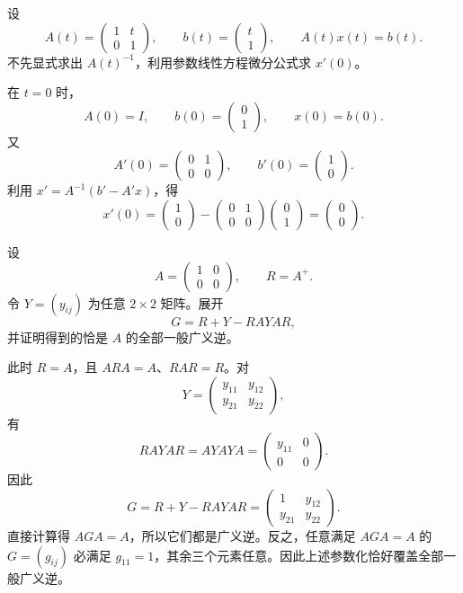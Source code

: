 \begin{exercise}[level=advanced]
设
\[
A(t)=\begin{pmatrix}1&t\\0&1\end{pmatrix},
\qquad
b(t)=\begin{pmatrix}t\\1\end{pmatrix},
\qquad
A(t)x(t)=b(t).
\]
不先显式求出 $A(t)^{-1}$，利用参数线性方程微分公式求 $x'(0)$。
\begin{solution}
在 $t=0$ 时，
\[
A(0)=I,
\qquad
b(0)=\begin{pmatrix}0\\1\end{pmatrix},
\qquad
x(0)=b(0).
\]
又
\[
A'(0)=\begin{pmatrix}0&1\\0&0\end{pmatrix},
\qquad
b'(0)=\begin{pmatrix}1\\0\end{pmatrix}.
\]
利用
$x'=A^{-1}(b'-A'x)$，得
\[
x'(0)
=\begin{pmatrix}1\\0\end{pmatrix}
-\begin{pmatrix}0&1\\0&0\end{pmatrix}
\begin{pmatrix}0\\1\end{pmatrix}
=\begin{pmatrix}0\\0\end{pmatrix}.
\]
\end{solution}
\end{exercise}

\begin{exercise}[level=advanced]
设
\[
A=\begin{pmatrix}1&0\\0&0\end{pmatrix},
\qquad R=A^+.
\]
令 $Y=(y_{ij})$ 为任意 $2\times2$ 矩阵。展开
\[
G=R+Y-RAYAR,
\]
并证明得到的恰是 $A$ 的全部一般广义逆。
\begin{solution}
此时 $R=A$，且 $ARA=A$、$RAR=R$。对
\[
Y=\begin{pmatrix}y_{11}&y_{12}\\y_{21}&y_{22}\end{pmatrix},
\]
有
\[
RAYAR=AYAYA
=\begin{pmatrix}y_{11}&0\\0&0\end{pmatrix}.
\]
因此
\[
G=R+Y-RAYAR
=\begin{pmatrix}1&y_{12}\\y_{21}&y_{22}\end{pmatrix}.
\]
直接计算得 $AGA=A$，所以它们都是广义逆。反之，任意满足 $AGA=A$ 的
$G=(g_{ij})$ 必满足 $g_{11}=1$，其余三个元素任意。因此上述参数化恰好覆盖全部一般广义逆。
\end{solution}
\end{exercise}

